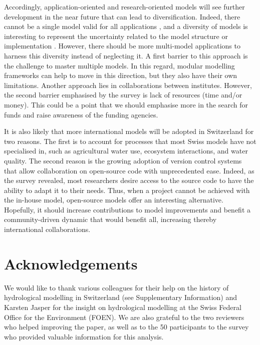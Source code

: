 \documentclass[10pt,a4paper]{article}
\begin{document}
Accordingly, application-oriented and research-oriented models will see further development in the near future that can lead to diversification. Indeed, there cannot be a single model valid for all applications \citep{Hamalainen2015}, and a diversity of models is interesting to represent the uncertainty related to the model structure or implementation \citep{Babel2019}. However, there should be more multi-model applications to harness this diversity instead of neglecting it. A first barrier to this approach is the challenge to master multiple models. In this regard, modular modelling frameworks can help to move in this direction, but they also have their own limitations. Another approach lies in collaborations between institutes. However, the second barrier emphasised by the survey is lack of resources (time and/or money). This could be a point that we should emphasise more in the search for funds and raise awareness of the funding agencies.

It is also likely that more international models will be adopted in Switzerland for two reasons. The first is to account for processes that most Swiss models have not specialised in, such as agricultural water use, ecosystem interactions, and water quality. The second reason is the growing adoption of version control systems that allow collaboration on open-source code with unprecedented ease. Indeed, as the survey revealed, most researchers desire access to the source code to have the ability to adapt it to their needs. Thus, when a project cannot be achieved with the in-house model, open-source models offer an interesting alternative. Hopefully, it should increase contributions to model improvements and benefit a community-driven dynamic that would benefit all, increasing thereby international collaborations.


\section*{Acknowledgements}

We would like to thank various colleagues for their help on the history of hydrological modelling in Switzerland (see Supplementary Information) and Karsten Jasper for the insight on hydrological modelling at the Swiss Federal Office for the Environment (FOEN). We are also grateful to the two reviewers who helped improving the paper, as well as to the 50 participants to the survey who provided valuable information for this analysis.
\end{document}

